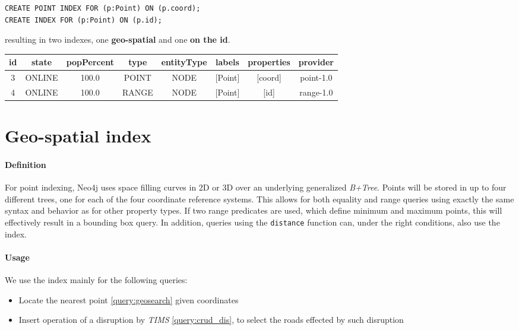 \begin{lstlisting}
CREATE POINT INDEX FOR (p:Point) ON (p.coord);
CREATE INDEX FOR (p:Point) ON (p.id);
\end{lstlisting}

resulting in two indexes, one \textbf{geo-spatial} and one \textbf{on the id}.

\begin{tabular}{|c|c|c|c|c|c|c|c|}
	\hline
	
	id & state & popPercent & type & entityType & labels & properties & provider \\
	
	\hline
	\hline
	
	3 & ONLINE & 100.0 & POINT & NODE & [Point] & [coord] & point-1.0 \\
	
	\hline
	
	4 & ONLINE & 100.0 & RANGE & NODE & [Point] & [id] & range-1.0 \\
	
	\hline
\end{tabular}

\section{Geo-spatial index}

\paragraph{Definition}
For point indexing, Neo4j uses space filling curves in 2D or 3D over an 
underlying generalized \textit{B+Tree}. Points will be stored in up to four 
different trees, one for each of the four coordinate reference systems. This 
allows for both equality and range queries using exactly the same syntax and 
behavior as for other property types. If two range predicates are used, which 
define minimum and maximum points, this will effectively result in a bounding 
box query. In addition, queries using the \texttt{distance} function can, under 
the right conditions, also use the index.

\paragraph{Usage}
We use the index mainly for the following queries:

\begin{itemize}
	\item Locate the nearest point \ref{query:geosearch} given coordinates
	
	\item Insert operation of a disruption by \textit{TIMS} \ref{query:crud_dis}, to select the roads effected by such disruption
\end{itemize}

